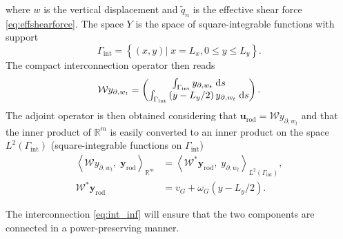 where $w$ is the vertical displacement and $\widetilde{q}_n$ is the effective shear force \eqref{eq:effshearforce}. The space $Y$ is the space of square-integrable functions with support
$$\Gamma_{\text{int}} = \left\{ (x,y) \vert \; x=L_x, 0 \le y \le L_y  \right\}.$$ The compact interconnection operator then reads
\begin{equation}\label{eq:intKP_infdim}
\mathcal{W} y_{\partial, w_t} = \begin{pmatrix}
\int_{\Gamma_{\text{int}}} y_{\partial, w_t} \d{s} \\
\int_{\Gamma_{\text{int}}} \left( y - L_y/2 \right) y_{\partial, w_t} \d{s} \\
\end{pmatrix}.
\end{equation}
The adjoint operator is then obtained considering that $\mathbf{u}_{\text{rod}} = \mathcal{W} y_{\partial, w_t}$ and that the inner product of $\mathbb{R}^m$ is easily converted to an inner product on the space $L^2(\Gamma_{\text{int}})$ (square-integrable functions on $\Gamma_{\text{int}}$)
\begin{align*}
\left\langle \mathcal{W} y_{\partial, w_t}, \; \mathbf{y}_{\text{rod}} \right\rangle_{\mathbb{R}^m} &= \left\langle \mathcal{W}^* \mathbf{y}_{\text{rod}} , \; y_{\partial, w_t} \right\rangle_{L^2(\Gamma_{\text{int}})}, \\
\mathcal{W}^* \mathbf{y}_{\text{rod}} &= v_G + \omega_{G} \left( y - L_y/2 \right).
\end{align*}

The interconnection \eqref{eq:int_inf} will ensure that the two components are connected in a power-preserving manner.

